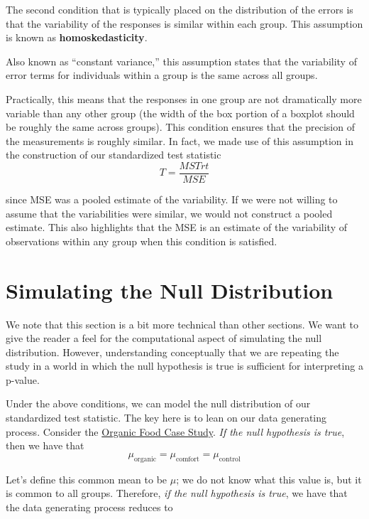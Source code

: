 \documentclass[]{book}
\theoremstyle{definition}
\theoremstyle{definition}
\theoremstyle{remark}
\let\BeginKnitrBlock\begin \let\EndKnitrBlock\end
\begin{document}
The second condition that is typically placed on the distribution of the
errors is that the variability of the responses is similar within each
group. This assumption is known as \textbf{homoskedasticity}.

\BeginKnitrBlock{definition}[Homoskedasticity]
\protect\hypertarget{def:defn-homoskedasticity}{}{\label{def:defn-homoskedasticity}
{} }Also known as ``constant variance,''
this assumption states that the variability of error terms for
individuals within a group is the same across all groups.
\EndKnitrBlock{definition}

Practically, this means that the responses in one group are not
dramatically more variable than any other group (the width of the box
portion of a boxplot should be roughly the same across groups). This
condition ensures that the precision of the measurements is roughly
similar. In fact, we made use of this assumption in the construction of
our standardized test statistic \[T = \frac{MSTrt}{MSE}\]

since MSE was a pooled estimate of the variability. If we were not
willing to assume that the variabilities were similar, we would not
construct a pooled estimate. This also highlights that the MSE is an
estimate of the variability of observations within any group when this
condition is satisfied.

\section{Simulating the Null
Distribution}\label{simulating-the-null-distribution}

We note that this section is a bit more technical than other sections.
We want to give the reader a feel for the computational aspect of
simulating the null distribution. However, understanding conceptually
that we are repeating the study in a world in which the null hypothesis
is true is sufficient for interpreting a p-value.

Under the above conditions, we can model the null distribution of our
standardized test statistic. The key here is to lean on our data
generating process. Consider the \protect\hyperlink{CaseOrganic}{Organic
Food Case Study}. \emph{If the null hypothesis is true}, then we have
that
\[\mu_{\text{organic}} = \mu_{\text{comfort}} = \mu_{\text{control}}\]

Let's define this common mean to be \(\mu\); we do not know what this
value is, but it is common to all groups. Therefore, \emph{if the null
hypothesis is true}, we have that the data generating process reduces to
\end{document}
